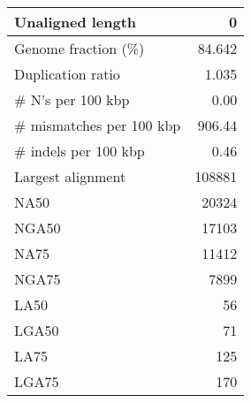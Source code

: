 \documentclass[12pt,a4paper]{article}
\begin{document}
\begin{table}[ht]
\begin{center}
\begin{tabular}{|l*{1}{|r}|}
Unaligned length & 0 \\ \hline
Genome fraction (\%) & 84.642 \\ \hline
Duplication ratio & 1.035 \\ \hline
\# N's per 100 kbp & 0.00 \\ \hline
\# mismatches per 100 kbp & 906.44 \\ \hline
\# indels per 100 kbp & 0.46 \\ \hline
Largest alignment & 108881 \\ \hline
NA50 & 20324 \\ \hline
NGA50 & 17103 \\ \hline
NA75 & 11412 \\ \hline
NGA75 & 7899 \\ \hline
LA50 & 56 \\ \hline
LGA50 & 71 \\ \hline
LA75 & 125 \\ \hline
LGA75 & 170 \\ \hline
\end{tabular}
\end{center}
\end{table}
\end{document}
